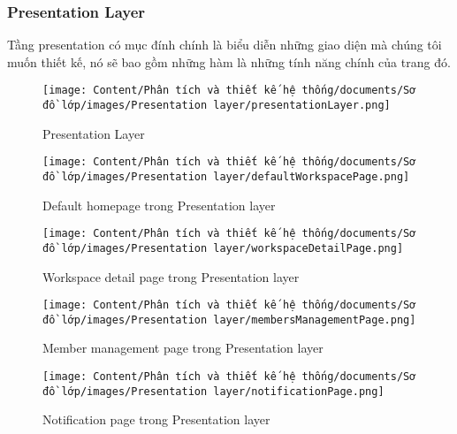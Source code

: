 \subsubsection{Presentation Layer}
Tầng presentation có mục đính chính là biểu diễn những giao diện mà chúng tôi
muốn thiết kế, nó sẽ bao gồm những hàm là những tính năng chính của trang đó.

\begin{figure}[H]
    \centering
    \texttt{[image: Content/Phân tích và thiết kế hệ thống/documents/Sơ đồ lớp/images/Presentation layer/presentationLayer.png]}
    \vspace{0.5cm}
    \caption{Presentation Layer}
    \label{fig:Presentation layer}
\end{figure}

\begin{figure}[H]
    \centering
    \texttt{[image: Content/Phân tích và thiết kế hệ thống/documents/Sơ đồ lớp/images/Presentation layer/defaultWorkspacePage.png]}
    \vspace{0.5cm}
    \caption{Default homepage trong Presentation layer}
    \label{fig:Default homepage trong Presentation layer}
\end{figure}

\begin{figure}[H]
    \centering
    \texttt{[image: Content/Phân tích và thiết kế hệ thống/documents/Sơ đồ lớp/images/Presentation layer/workspaceDetailPage.png]}
    \vspace{0.5cm}
    \caption{Workspace detail page trong Presentation layer}
    \label{fig:Workspace detail page trong Presentation layer}
\end{figure}

\begin{figure}[H]
    \centering
    \texttt{[image: Content/Phân tích và thiết kế hệ thống/documents/Sơ đồ lớp/images/Presentation layer/membersManagementPage.png]}
    \vspace{0.5cm}
    \caption{Member management page trong Presentation layer}
    \label{fig:Member management page trong Presentation layer}
\end{figure}

\begin{figure}[H]
    \centering
    \texttt{[image: Content/Phân tích và thiết kế hệ thống/documents/Sơ đồ lớp/images/Presentation layer/notificationPage.png]}
    \vspace{0.5cm}
    \caption{Notification page trong Presentation layer}
    \label{fig:Notification page trong Presentation layer}
\end{figure}

